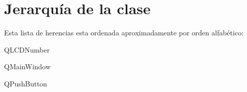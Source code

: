 \section{Jerarquía de la clase}
Esta lista de herencias esta ordenada aproximadamente por orden alfabético\-:\begin{DoxyCompactList}
\item Q\-L\-C\-D\-Number\begin{DoxyCompactList}
\item {}
\end{DoxyCompactList}
\item Q\-Main\-Window\begin{DoxyCompactList}
\item {}
\end{DoxyCompactList}
\item Q\-Push\-Button\begin{DoxyCompactList}
\item {}
\end{DoxyCompactList}
\end{DoxyCompactList}
